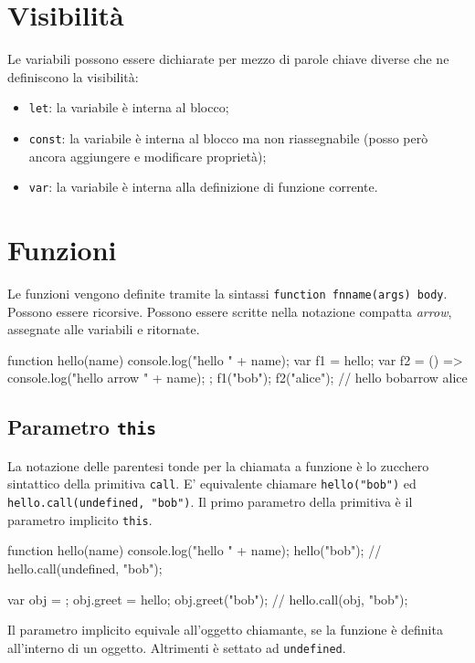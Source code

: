 \section{Visibilità}

Le variabili possono essere dichiarate per mezzo di parole chiave diverse che ne definiscono la visibilità:
\begin{itemize}
    \item \texttt{let}: la variabile è interna al blocco;
    \item \texttt{const}: la variabile è interna al blocco ma non riassegnabile (posso però ancora aggiungere e modificare proprietà);
    \item \texttt{var}: la variabile è interna alla definizione di funzione corrente.
\end{itemize}

\section{Funzioni}

Le funzioni vengono definite tramite la sintassi \texttt{function fnname(args) {body}}. Possono essere ricorsive. Possono essere scritte nella notazione compatta \emph{arrow}, assegnate alle variabili e ritornate.
\begin{javascriptcode}
function hello(name) {
    console.log("hello " + name);
}
var f1 = hello;
var f2 = () => { console.log("hello arrow " + name); };
f1("bob"); f2("alice"); // hello bob\nhello arrow alice
\end{javascriptcode}

\subsection{Parametro \texttt{this}}

La notazione delle parentesi tonde per la chiamata a funzione è lo zucchero sintattico della primitiva \texttt{call}. E' equivalente chiamare \texttt{hello("bob")} ed \texttt{hello.call(undefined, "bob")}. Il primo parametro della primitiva è il parametro implicito \texttt{this}.
\begin{javascriptcode}
function hello(name) {
    console.log("hello " + name);
}
hello("bob"); // hello.call(undefined, "bob");

var obj = { };
obj.greet = hello;
obj.greet("bob"); // hello.call(obj, "bob");
\end{javascriptcode}
Il parametro implicito equivale all'oggetto chiamante, se la funzione è definita all'interno di un oggetto. Altrimenti è settato ad \texttt{undefined}.

